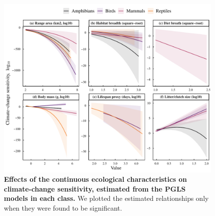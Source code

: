 \begin{figure}[h!]
\centering
\includegraphics[scale=0.7]{figures/Chapter4/Figure6}
\caption[Effects of the continuous ecological characteristics on climate-change sensitivity, estimated from the PGLS models in each class.]{\textbf{Effects of the continuous ecological characteristics on climate-change sensitivity, estimated from the PGLS models in each class.} We plotted the estimated relationships only when they were found to be significant. }
\label{chap4_fig6}
\end{figure}


